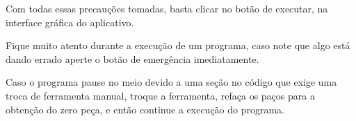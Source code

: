 \documentclass[twoside,a4paper]{refart}
\begin{document}
Com todas essas precauções tomadas, basta clicar no botão de executar, na interface gráfica do aplicativo. 

\attention Fique muito atento durante a execução de um programa, caso note que algo está dando errado aperte o botão de emergência imediatamente.

\attention Caso o programa pause no meio devido a uma seção no código que exige uma troca de ferramenta manual, troque a ferramenta, refaça os paços para a obtenção do zero peça, e então continue a execução do programa.  
\end{document}
